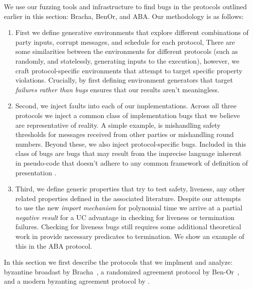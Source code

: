 We use our fuzzing tools and infrastructure to find bugs in the protocols outlined earlier in this section: Bracha, BenOr, and ABA.
Our methodology is as follows:
\begin{enumerate}
\item First we define generative environments that explore different combinations of party inputs, corrupt messages, and schedule for each protocol, There are some similarities between the environments for different protocols (such as randomly, and statelessly, generating inputs to the execution), however, we craft protocol-specific environments that attempt to target specific property violations. Crucially, by first defining environment generators that target \emph{failures rather than bugs} ensures that our results aren't meaningless.
\item Second, we inject faults into each of our implementations. Across all three protocols we inject a common class of implementation bugs that we believe are representative of reality. A simple example, is mishandling safety thresholds for messages received from other parties or mishandling round numbers. Beyond these, we also inject protocol-specific bugs. Included in this class of bugs are bugs that may result from the imprecise language inherent in pseudo-code that doesn't adhere to any common framework of definition of presentation .
\item Third, we define generic properties that try to test safety, liveness, any other related properties defined in the associated literature. Despite our attempts to use the new \emph{import mechanism} for polynomial time we arrive at a partial \emph{negative result} for a UC advantage in checking for liveness or termination failures. Checking for liveness bugs still requires some additional theoretical work in provide necessary predicates to termination. We show an example of this in the ABA protocol.  
\end{enumerate}

In this section we first describe the protocols that we implment and analyze: byzantine broadast by Bracha~\cite{bracha}, a randomized agreement protocol by Ben-Or~\cite{Ben-Or}, and a modern byzanting agreement protocol by \cite{who}.

